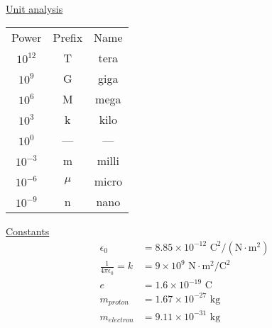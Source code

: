 \thispagestyle{empty}
\newcommand{\degrees}{$^\circ$}
\setlength{\parindent}{12pt}

\begin{center}
\\
\end{center}
\begin{multicols}{2}
\begin{minipage}{\columnwidth}
\centering\underline{Unit analysis}\\
\begin{tabular}{c c c}
Power & Prefix & Name\\
$10^{12}$ & T & tera\\
$10^9$ & G & giga\\
$10^6$ & M & mega\\
$10^3$ & k & kilo\\
$10^0$ & --- & ---\\
$10^{-3}$ & m & milli\\
$10^{-6}$ & $\mu$ & micro\\
$10^{-9}$ & n & nano
\end{tabular}
\end{minipage}

\vspace{12pt}
\begin{minipage}{\columnwidth}
\centering\underline{Constants}
\begin{align*}
\epsilon_0 &= 8.85\times 10^{-12} \text{ C}^2/ \left(\text{N}\cdot\text{m}^2\right)\\
\frac{1}{4\pi\epsilon_0} = k&=9\times 10^9 \text{ N}\cdot \text{m}^2/\text{C}^2\\
e&=1.6\times 10^{-19} \text{ C}\\
m_{proton}&=1.67\times 10^{-27}\text{ kg}\\
m_{electron}&=9.11\times 10^{-31}\text{ kg}\\
\end{align*}
\end{minipage}



\end{multicols}
